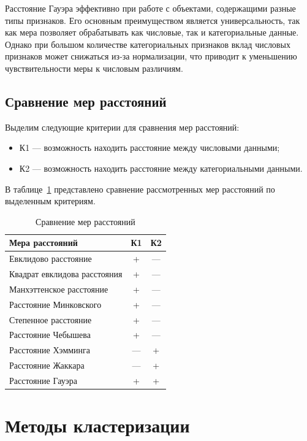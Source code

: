 Расстояние Гауэра эффективно при работе с объектами, содержащими разные типы признаков. Его основным преимуществом является универсальность, так как мера позволяет обрабатывать как числовые, так и категориальные данные. Однако при большом количестве категориальных признаков вклад числовых признаков может снижаться из-за нормализации, что приводит к уменьшению чувствительности меры к числовым различиям.

\subsection{Сравнение мер расстояний}
Выделим следующие критерии для сравнения мер расстояний:
\begin{itemize}
	\item[---] К1 --- возможность находить расстояние между числовыми данными;
	\item[---] К2 --- возможность находить расстояние между категориальными данными.
\end{itemize}


В таблице~\ref{tbl::dst_meas} представлено сравнение рассмотренных мер расстояний по выделенным критериям.
\begin{table}[H]
	\begin{center}
		\caption{Сравнение мер расстояний}
		\begin{tabular}{|l|c|c|}
			\hline
			\textbf{Мера расстояний} & \textbf{К1} & \textbf{К2} \\
			\hline
			Евклидово расстояние & + & --- \\
			\hline
			Квадрат евклидова расстояния & + & --- \\
			\hline
			Манхэттенское расстояние & + & --- \\
			\hline
			Расстояние Минковского & + & --- \\
			\hline
			Степенное расстояние & + & --- \\
			\hline
			Расстояние Чебышева & + & --- \\
			\hline
			Расстояние Хэмминга & --- & + \\
			\hline
			Расстояние Жаккара & --- & + \\
			\hline
			Расстояние Гауэра & + & + \\
			\hline
		\end{tabular}
		\label{tbl::dst_meas}
	\end{center}
\end{table}

\section{Методы кластеризации}

